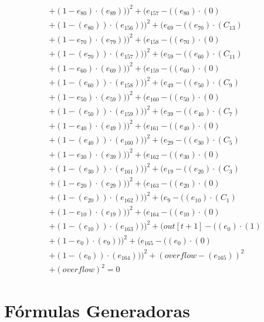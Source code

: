 \documentclass[10pt, a4paper]{article}
\begin{document}
\begin{align*}
& + (1 - e_{80})  \cdot  (e_{89})))^{2} + (e_{157} - ((e_{80}) \cdot (0) \\
& + (1 - (e_{80})) \cdot (e_{156})))^{2} + (e_{69} - ((e_{70})  \cdot  (C_{13}) \\
& + (1 - e_{70})  \cdot  (e_{79})))^{2} + (e_{158} - ((e_{70}) \cdot (0) \\
& + (1 - (e_{70})) \cdot (e_{157})))^{2} + (e_{59} - ((e_{60})  \cdot  (C_{11}) \\
& + (1 - e_{60})  \cdot  (e_{69})))^{2} + (e_{159} - ((e_{60}) \cdot (0) \\
& + (1 - (e_{60})) \cdot (e_{158})))^{2} + (e_{49} - ((e_{50})  \cdot  (C_{9}) \\
& + (1 - e_{50})  \cdot  (e_{59})))^{2} + (e_{160} - ((e_{50}) \cdot (0) \\
& + (1 - (e_{50})) \cdot (e_{159})))^{2} + (e_{39} - ((e_{40})  \cdot  (C_{7}) \\
& + (1 - e_{40})  \cdot  (e_{49})))^{2} + (e_{161} - ((e_{40}) \cdot (0) \\
& + (1 - (e_{40})) \cdot (e_{160})))^{2} + (e_{29} - ((e_{30})  \cdot  (C_{5}) \\
& + (1 - e_{30})  \cdot  (e_{39})))^{2} + (e_{162} - ((e_{30}) \cdot (0) \\
& + (1 - (e_{30})) \cdot (e_{161})))^{2} + (e_{19} - ((e_{20})  \cdot  (C_{3}) \\
& + (1 - e_{20})  \cdot  (e_{29})))^{2} + (e_{163} - ((e_{20}) \cdot (0) \\
& + (1 - (e_{20})) \cdot (e_{162})))^{2} + (e_{9} - ((e_{10})  \cdot  (C_{1}) \\
& + (1 - e_{10})  \cdot  (e_{19})))^{2} + (e_{164} - ((e_{10}) \cdot (0) \\
& + (1 - (e_{10})) \cdot (e_{163})))^{2} + (out[t+1] - ((e_{0})  \cdot  (1) \\
& + (1 - e_{0})  \cdot  (e_{9})))^{2} + (e_{165} - ((e_{0}) \cdot (0) \\
& + (1 - (e_{0})) \cdot (e_{164})))^{2} + (overflow - (e_{165}))^{2} \\
& + (overflow)^{2} = 0
\end{align*}\part{Fórmulas Generadoras}
\end{document}
